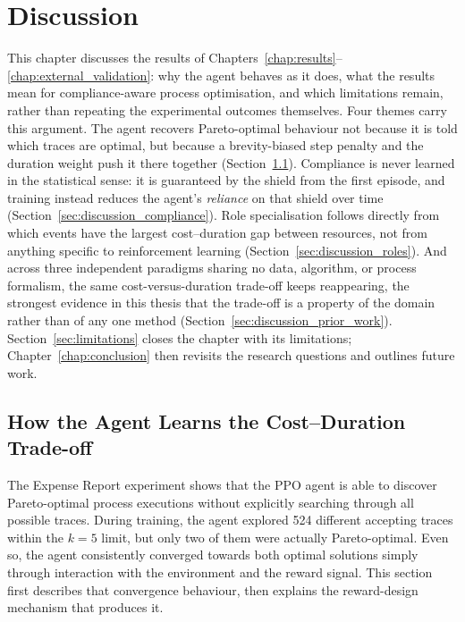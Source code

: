 
\chapter{Discussion}
\label{chap:discussion}

This chapter discusses the results of Chapters~\ref{chap:results}--\ref{chap:external_validation}: why the agent behaves as it does, what the results mean for compliance-aware process optimisation, and which limitations remain, rather than repeating the experimental outcomes themselves. Four themes carry this argument. The agent recovers Pareto-optimal behaviour not because it is told which traces are optimal, but because a brevity-biased step penalty and the duration weight push it there together (Section~\ref{sec:discussion_tradeoff}). Compliance is never learned in the statistical sense: it is guaranteed by the shield from the first episode, and training instead reduces the agent's \emph{reliance} on that shield over time (Section~\ref{sec:discussion_compliance}). Role specialisation follows directly from which events have the largest cost--duration gap between resources, not from anything specific to reinforcement learning (Section~\ref{sec:discussion_roles}). And across three independent paradigms sharing no data, algorithm, or process formalism, the same cost-versus-duration trade-off keeps reappearing, the strongest evidence in this thesis that the trade-off is a property of the domain rather than of any one method (Section~\ref{sec:discussion_prior_work}). Section~\ref{sec:limitations} closes the chapter with its limitations; Chapter~\ref{chap:conclusion} then revisits the research questions and outlines future work.

\section{How the Agent Learns the Cost--Duration Trade-off}
\label{sec:discussion_tradeoff}
\label{sec:discussion_reward}
\label{sec:discussion_reward_design}

The Expense Report experiment shows that the \ac{PPO} agent is able to discover Pareto-optimal process executions without explicitly searching through all possible traces. During training, the agent explored 524 different accepting traces within the $k{=}5$ limit, but only two of them were actually Pareto-optimal. Even so, the agent consistently converged towards both optimal solutions simply through interaction with the environment and the reward signal. This section first describes that convergence behaviour, then explains the reward-design mechanism that produces it.

